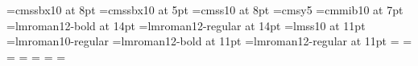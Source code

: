 \newfam\ChordFam
\font\ChordFontText=cmssbx10 at 8pt %
\font\ChordFontExp=cmssbx10 at 5pt  %
\font\ChordFontBass=cmss10 at 8pt %
\font\ChordFontExpSymb=cmsy5
\font\ChordSymb=cmmib10 at 7pt %
%
\font\SongNameFont=lmroman12-bold at 14pt       %
\font\ReferenceFont=lmroman12-regular at 14pt
\font\AuthorFont=lmss10 at 11pt
%
\font\TextFont=lmroman10-regular
\font\PageFont=lmroman12-bold at 11pt
\font\IndexFont=lmroman12-regular at 11pt
%
\textfont\ChordFam=\ChordFontText
\scriptfont\ChordFam=\ChordFontExp
\scriptscriptfont\ChordFam=\ChordFontBass
{}=\ChordFontExpSymb
{}=\ChordSymb
{}=\ChordSymb
{}=\ChordSymb
\def\setformatA{\fam=\ChordFam\textstyle} 
\def\setformatB{\fam=\ChordFam\scriptstyle}
\def\setformatC{\fam=\ChordFam\scriptscriptstyle}
\def\MakeBase#1{\csname MakeTone#1\endcsname}
\def\MakeToneA{A\kern-.13em}
\def\MakeToneB{B}
\def\MakeToneC{C}
\def\MakeToneD{D}
\def\MakeToneE{E}
\def\MakeToneF{F}
\def\MakeToneG{G}
\def\MakeToneH{H}
\def\MakeScrut{{\setbox0=\hbox{H}\vbox to \ht0{}}}
\def\MakeFlat{^\flat\kern-.09em\MakeScrut}
\def\MakeSharp{^\sharp\kern-.09em\MakeScrut}
\def\MakeExpPlus{{\ChordFontExp\raise+.2ex\hbox{+}}}
\def\MakeExpMinus{{-}}
\def\MakeBasePlus{{\ChordFontText\raise+.2ex\hbox{+}}}
\def\MakeBaseMinus{{\scriptstyle -}}
\def\MakeAfterExpKern{\kern-.1em} %
\def\MakeBassRaise{-.3ex}  %
\def\fixchordspace{0.4em}  %
\def\pluschordspace{0.3em} %
\def\chordraise{2.2ex}     %
\def\MakeSongHeader#1#2#3#4#5{{%
  \noindent\SongNameFont\unspace#1%
  \write\TOCfile{\string\tocline{#1}{\the\pageno}}%
  \if:#5:\else%
  { }(\unspace#5)%
  \if:#2:\else%
  \hfill\bgroup\TextFont(\hskip.3em{\AuthorFont\unspace#2\/}\hskip.3em)\egroup
  \fi\fi\par%
  \penalty 10000%
}}

